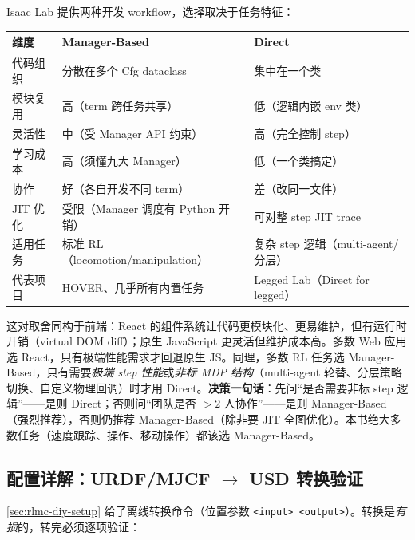 Isaac Lab 提供两种开发 workflow，选择取决于任务特征：

\begin{center}
\small
\begin{tabular}{@{}lp{4.4cm}p{4.8cm}@{}}
\toprule
维度 & Manager-Based & Direct \\
\midrule
代码组织 & 分散在多个 Cfg dataclass & 集中在一个类 \\
模块复用 & 高（term 跨任务共享） & 低（逻辑内嵌 env 类） \\
灵活性 & 中（受 Manager API 约束） & 高（完全控制 step） \\
学习成本 & 高（须懂九大 Manager） & 低（一个类搞定） \\
协作 & 好（各自开发不同 term） & 差（改同一文件） \\
JIT 优化 & 受限（Manager 调度有 Python 开销） & 可对整 step JIT trace \\
适用任务 & 标准 RL（locomotion/manipulation） & 复杂 step 逻辑（multi-agent/分层） \\
代表项目 & HOVER、几乎所有内置任务 & Legged Lab（Direct for legged） \\
\bottomrule
\end{tabular}
\end{center}

\begin{insight}\label{ins:rlmc-diy-react}
这对取舍同构于前端：React 的组件系统让代码更模块化、更易维护，但有运行时开销（virtual DOM diff）；原生 JavaScript 更灵活但维护成本高。多数 Web 应用选 React，只有极端性能需求才回退原生 JS。同理，多数 RL 任务选 Manager-Based，只有需要\emph{极端 step 性能}或\emph{非标 MDP 结构}（multi-agent 轮替、分层策略切换、自定义物理回调）时才用 Direct。\textbf{决策一句话}：先问“是否需要非标 step 逻辑”——是则 Direct；否则问“团队是否 $>2$ 人协作”——是则 Manager-Based（强烈推荐），否则仍推荐 Manager-Based（除非要 JIT 全图优化）。本书绝大多数任务（速度跟踪、操作、移动操作）都该选 Manager-Based。
\end{insight}

\subsection{\texorpdfstring{配置详解：URDF/MJCF $\to$ USD 转换验证}{配置详解：URDF/MJCF 到 USD 转换验证}}
\label{sec:rlmc-diy-isaac-convert}

\cref{sec:rlmc-diy-setup} 给了离线转换命令（位置参数 \verb|<input> <output>|）。转换是\emph{有损}的，转完必须逐项验证：

